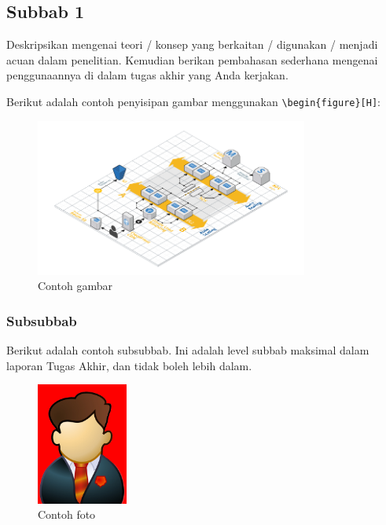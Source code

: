 \subsection{Subbab 1} \label{II.Subbab1}
Deskripsikan mengenai teori / konsep yang berkaitan / digunakan / menjadi acuan dalam penelitian. Kemudian berikan pembahasan sederhana mengenai penggunaannya di dalam tugas akhir yang Anda kerjakan. \par

Berikut adalah contoh penyisipan gambar menggunakan \verb|\begin{figure}[H]|:

\begin{figure}[H] %
    \centering
    \includegraphics[width=0.8\textwidth]{figure/chapter-2-infrastructure-diagram.png}
    \caption{Contoh gambar}
    \label{fig:2.contoh}
\end{figure}

\subsubsection{Subsubbab} \label{II.Subsubbab1}

Berikut adalah contoh subsubbab. Ini adalah level subbab maksimal dalam laporan Tugas Akhir, dan tidak boleh lebih dalam.

\begin{figure}[H]
	\centering
	\includegraphics[width=3cm]{figure/samplephoto.jpg}
	\caption{Contoh foto}
	\label{fig:2.foto}
\end{figure}

